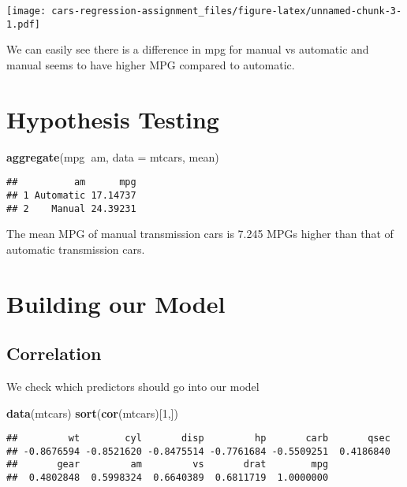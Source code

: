 \documentclass[]{article}
\newenvironment{Shaded}{\begin{snugshade}}{\end{snugshade}}
\newcommand{\KeywordTok}[1]{\textcolor[rgb]{0.13,0.29,0.53}{\textbf{#1}}}
\newcommand{\DataTypeTok}[1]{\textcolor[rgb]{0.13,0.29,0.53}{#1}}
\newcommand{\DecValTok}[1]{\textcolor[rgb]{0.00,0.00,0.81}{#1}}
\newcommand{\OperatorTok}[1]{\textcolor[rgb]{0.81,0.36,0.00}{\textbf{#1}}}
\newcommand{\NormalTok}[1]{#1}
\begin{document}
\texttt{[image: cars-regression-assignment\_files/figure-latex/unnamed-chunk-3-1.pdf]}

We can easily see there is a difference in mpg for manual vs automatic
and manual seems to have higher MPG compared to automatic.

\section{Hypothesis Testing}\label{hypothesis-testing}

\begin{Shaded}
\begin{Highlighting}[]
\KeywordTok{aggregate}\NormalTok{(mpg}\OperatorTok{~}\NormalTok{am, }\DataTypeTok{data =}\NormalTok{ mtcars, mean)}
\end{Highlighting}
\end{Shaded}

\begin{verbatim}
##          am      mpg
## 1 Automatic 17.14737
## 2    Manual 24.39231
\end{verbatim}

The mean MPG of manual transmission cars is 7.245 MPGs higher than that
of automatic transmission cars.

\section{Building our Model}\label{building-our-model}

\subsection{Correlation}\label{correlation}

We check which predictors should go into our model

\begin{Shaded}
\begin{Highlighting}[]
\KeywordTok{data}\NormalTok{(mtcars)}
\KeywordTok{sort}\NormalTok{(}\KeywordTok{cor}\NormalTok{(mtcars)[}\DecValTok{1}\NormalTok{,])}
\end{Highlighting}
\end{Shaded}

\begin{verbatim}
##         wt        cyl       disp         hp       carb       qsec 
## -0.8676594 -0.8521620 -0.8475514 -0.7761684 -0.5509251  0.4186840 
##       gear         am         vs       drat        mpg 
##  0.4802848  0.5998324  0.6640389  0.6811719  1.0000000
\end{verbatim}
\end{document}
